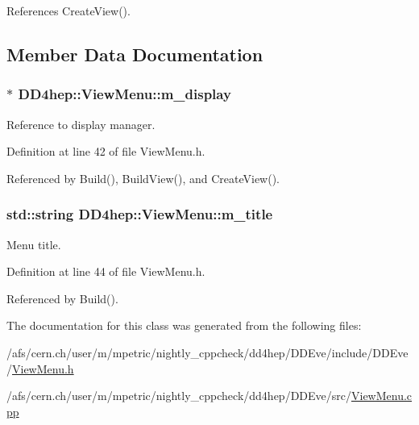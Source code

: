 References CreateView().

\subsection{Member Data Documentation}
\hypertarget{class_d_d4hep_1_1_view_menu_ac7a1b305e90ceedc0b6294389843473e}{
\subsubsection[{m\_\-display}]{$\ast$ {\bf DD4hep::ViewMenu::m\_\-display}}}
\label{class_d_d4hep_1_1_view_menu_ac7a1b305e90ceedc0b6294389843473e}


Reference to display manager. 

Definition at line 42 of file ViewMenu.h.

Referenced by Build(), BuildView(), and CreateView().\hypertarget{class_d_d4hep_1_1_view_menu_a1562e57c30d77349a81e1d6e93918293}{
\subsubsection[{m\_\-title}]{\setlength{\rightskip}{0pt plus 5cm}std::string {\bf DD4hep::ViewMenu::m\_\-title}}}
\label{class_d_d4hep_1_1_view_menu_a1562e57c30d77349a81e1d6e93918293}


Menu title. 

Definition at line 44 of file ViewMenu.h.

Referenced by Build().

The documentation for this class was generated from the following files:\begin{DoxyCompactItemize}
\item 
/afs/cern.ch/user/m/mpetric/nightly\_\-cppcheck/dd4hep/DDEve/include/DDEve/\hyperlink{_view_menu_8h}{ViewMenu.h}\item 
/afs/cern.ch/user/m/mpetric/nightly\_\-cppcheck/dd4hep/DDEve/src/\hyperlink{_view_menu_8cpp}{ViewMenu.cpp}\end{DoxyCompactItemize}
